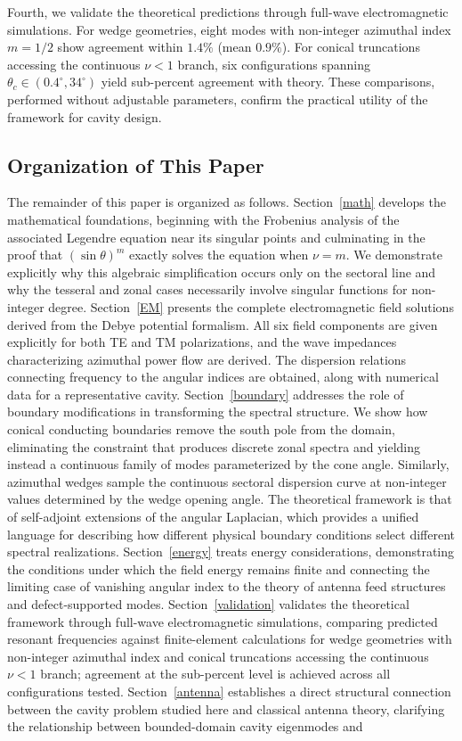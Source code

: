 \documentclass[
  aip,
  amsmath,amssymb,
  preprint
]{revtex4-1}
\begin{document}
Fourth, we validate the theoretical predictions through full-wave electromagnetic simulations. For wedge geometries, eight modes with non-integer azimuthal index $m=1/2$ show agreement within $1.4\%$ (mean $0.9\%$). For conical truncations accessing the continuous $\nu<1$ branch, six configurations spanning $\theta_c\in(0.4^\circ,34^\circ)$ yield sub-percent agreement with theory. These comparisons, performed without adjustable parameters, confirm the practical utility of the framework for cavity design.




\subsection{Organization of This Paper}


The remainder of this paper is organized as follows. Section~\ref{math} develops the mathematical foundations, beginning with the Frobenius analysis of the associated Legendre equation near its singular points and culminating in the proof that $(\sin\theta)^m$ exactly solves the equation when $\nu = m$. We demonstrate explicitly why this algebraic simplification occurs only on the sectoral line and why the tesseral and zonal cases necessarily involve singular functions for non-integer degree. Section~\ref{EM} presents the complete electromagnetic field solutions derived from the Debye potential formalism. All six field components are given explicitly for both TE and TM polarizations, and the wave impedances characterizing azimuthal power flow are derived. The dispersion relations connecting frequency to the angular indices are obtained, along with numerical data for a representative cavity. Section~\ref{boundary} addresses the role of boundary modifications in transforming the spectral structure. We show how conical conducting boundaries remove the south pole from the domain, eliminating the constraint that produces discrete zonal spectra and yielding instead a continuous family of modes parameterized by the cone angle. Similarly, azimuthal wedges sample the continuous sectoral dispersion curve at non-integer values determined by the wedge opening angle. The theoretical framework is that of self-adjoint extensions of the angular Laplacian, which provides a unified language for describing how different physical boundary conditions select different spectral realizations. Section~\ref{energy} treats energy considerations, demonstrating the conditions under which the field energy remains finite and connecting the limiting case of vanishing angular index to the theory of antenna feed structures and defect-supported modes. Section~\ref{validation} validates the theoretical framework through full-wave electromagnetic simulations, comparing predicted resonant frequencies against finite-element calculations for wedge geometries with non-integer azimuthal index and conical truncations accessing the continuous $\nu<1$ branch; agreement at the sub-percent level is achieved across all configurations tested. Section~\ref{antenna} establishes a direct structural connection between the cavity problem studied here and classical antenna theory, clarifying the relationship between bounded-domain cavity eigenmodes and 
\end{document}
